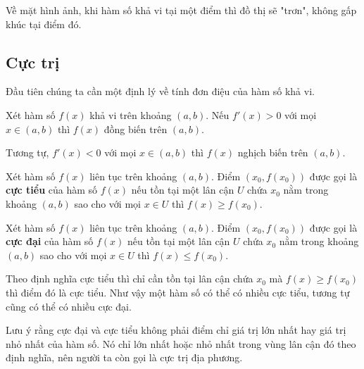 Về mặt hình ảnh, khi hàm số khả vi tại một điểm thì đồ thị sẽ "trơn", không gấp khúc tại điểm đó.

\subsection*{Cực trị}

Đầu tiên chúng ta cần một định lý về tính đơn điệu của hàm số
khả vi.

\begin{theorem}
    Xét hàm số $f(x)$ khả vi trên khoảng $(a, b)$. Nếu $f'(x) > 0$ 
    với mọi $x \in (a, b)$ thì $f(x)$ đồng biến trên $(a, b)$.
\end{theorem}

Tương tự, $f'(x) < 0$ với mọi $x \in (a, b)$ thì $f(x)$ nghịch biến trên
$(a, b)$.

\begin{definition}
    Xét hàm số $f(x)$ liên tục trên khoảng $(a, b)$. Điểm $(x_0, f(x_0))$ được
    gọi là \textbf{cực tiểu} của hàm số $f(x)$ nếu tồn tại một lân cận $U$
    chứa $x_0$ nằm trong khoảng $(a, b)$ sao cho với mọi $x \in U$ thì $f(x) \geqslant f(x_0)$.
\end{definition}

\begin{definition}
    Xét hàm số $f(x)$ liên tục trên khoảng $(a, b)$. Điểm $(x_0, f(x_0))$ được
    gọi là \textbf{cực đại} của hàm số $f(x)$ nếu tồn tại một lân cận $U$
    chứa $x_0$ nằm trong khoảng $(a, b)$ sao cho với mọi $x \in U$ thì $f(x) \leqslant f(x_0)$.
\end{definition}

Theo định nghĩa cực tiểu thì chỉ cần tồn tại lân cận chứa $x_0$
mà $f(x) \geqslant f(x_0)$ thì điểm đó là cực tiểu. Như vậy một hàm số có 
thể có nhiều cực tiểu, tương tự cũng có thể có nhiều cực đại.

Lưu ý rằng cực đại và cực tiểu không phải điểm chỉ giá trị lớn nhất
hay giá trị nhỏ nhất của hàm số. Nó chỉ lớn nhất hoặc nhỏ nhất trong
vùng lân cận đó theo định nghĩa, nên người ta còn gọi là cực trị địa phương.


